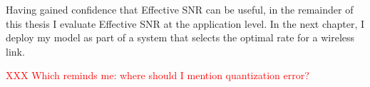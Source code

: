 Having gained confidence that Effective SNR can be useful, in the remainder of this thesis I evaluate Effective SNR at the application level. In the next chapter, I deploy my model as part of a system that selects the optimal rate for a wireless link.

\textcolor{red}{XXX Which reminds me: where should I mention quantization error?}

\ifx\mainfile\undefined

\fi
